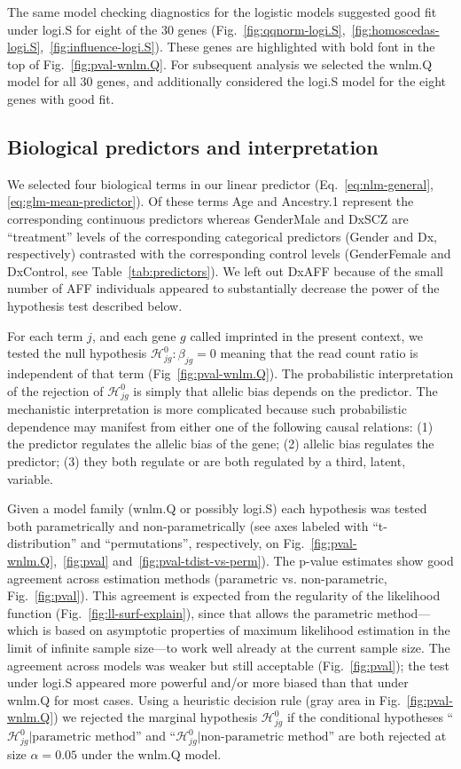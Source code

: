 \documentclass[12pt,letterpaper]{article}
\begin{document}
The same model checking diagnostics for the logistic models suggested good
fit under logi.S for eight of the 30 genes
(Fig.~\ref{fig:qqnorm-logi.S},~\ref{fig:homoscedas-logi.S},~\ref{fig:influence-logi.S}).
These genes are highlighted with bold font in the top of Fig.~\ref{fig:pval-wnlm.Q}.
For subsequent analysis we selected  the wnlm.Q model for all 30 genes, and
additionally considered the logi.S model for the eight
genes with good fit.

\subsection{Biological predictors and interpretation}

We selected four biological terms in our linear predictor
(Eq.~\ref{eq:nlm-general}, \ref{eq:glm-mean-predictor}).  Of these terms Age
and Ancestry.1 represent the corresponding continuous predictors whereas
GenderMale and DxSCZ are “treatment” levels of the corresponding categorical
predictors (Gender and Dx, respectively) contrasted with the corresponding
control levels (GenderFemale and DxControl, see Table~\ref{tab:predictors}).
We left out DxAFF because of the small number of AFF individuals appeared to
substantially decrease the power of the hypothesis test described below.

For each term \(j\), and each gene \(g\) called imprinted in the present
context, we tested the null hypothesis \(\mathcal{H}^0_{jg} : \beta_{jg} = 0\)
meaning that the read count ratio is independent of that term
(Fig~\ref{fig:pval-wnlm.Q}).  The probabilistic interpretation of the
rejection of \(\mathcal{H}^0_{jg}\) is simply that allelic bias depends on
the predictor.  The mechanistic interpretation is more complicated because
such probabilistic dependence may manifest from either one of the following
causal relations: (1) the predictor regulates the allelic bias of the gene;
(2) allelic bias regulates the predictor; (3) they both regulate or are both
regulated by a third, latent, variable.

Given a model family (wnlm.Q or possibly logi.S) each hypothesis was tested
both parametrically and non-parametrically (see axes labeled with
``t-distribution'' and ``permutations'', respectively, on
Fig.~\ref{fig:pval-wnlm.Q},~\ref{fig:pval} and~\ref{fig:pval-tdist-vs-perm}).
The p-value estimates show good agreement across estimation methods
(parametric vs. non-parametric, Fig.~\ref{fig:pval}). This agreement is
expected from the regularity of the likelihood function
(Fig.~\ref{fig:ll-surf-explain}), since that allows the parametric
method---which is based on asymptotic properties of maximum likelihood
estimation in the limit of infinite sample size---to work well already at the
current sample size. The agreement across models was weaker but still
acceptable (Fig.~\ref{fig:pval}); the test under logi.S appeared more powerful
and/or more biased than that under wnlm.Q for most cases. Using a heuristic
decision rule (gray area in Fig.~\ref{fig:pval-wnlm.Q}) we rejected the
marginal hypothesis \(\mathcal{H}^0_{jg}\) if the conditional hypotheses
``\(\mathcal{H}^0_{jg} |\text{parametric method}\)'' and
``\(\mathcal{H}^0_{jg} |\text{non-parametric method}\)'' are both rejected at
size \(\alpha = 0.05\) under the wnlm.Q model.
\end{document}
